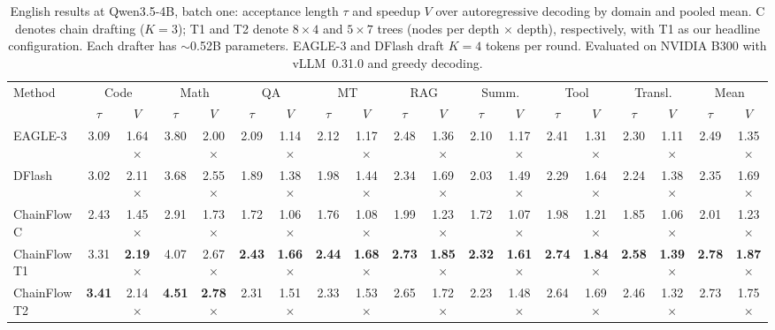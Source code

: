 \documentclass{article}
\newcommand{\Sys}{ChainFlow\xspace}
\newcommand{\TargetFamily}{Qwen3.5\xspace}          %
\newcommand{\Kserve}{3}                      %
\begin{document}
\begin{table}[!t]
\centering\small
\setlength{\tabcolsep}{2.5pt}
\caption{English results at \TargetFamily-4B, batch one: acceptance length $\tau$ and speedup $V$ over autoregressive decoding by domain and pooled mean. C denotes chain drafting ($K{=}\Kserve$); T1 and T2 denote $8\times4$ and $5\times7$ trees (nodes per depth $\times$ depth), respectively, with T1 as our headline configuration. Each drafter has $\sim$0.52B parameters. EAGLE-3 and DFlash draft $K{=}4$ tokens per round. Evaluated on NVIDIA B300 with vLLM~0.31.0 and greedy decoding.}
\label{tab:main}
\vskip 0.1in
\begin{tabular}{l *{8}{cc} | cc}
\toprule
Method & \multicolumn{2}{c}{Code} & \multicolumn{2}{c}{Math} & \multicolumn{2}{c}{QA} & \multicolumn{2}{c}{MT} & \multicolumn{2}{c}{RAG} & \multicolumn{2}{c}{Summ.} & \multicolumn{2}{c}{Tool} & \multicolumn{2}{c}{Transl.} & \multicolumn{2}{c}{Mean} \\
\cmidrule(lr){2-3} \cmidrule(lr){4-5} \cmidrule(lr){6-7} \cmidrule(lr){8-9} \cmidrule(lr){10-11} \cmidrule(lr){12-13} \cmidrule(lr){14-15} \cmidrule(lr){16-17} \cmidrule(lr){18-19}
& $\tau$ & $V$ & $\tau$ & $V$ & $\tau$ & $V$ & $\tau$ & $V$ & $\tau$ & $V$ & $\tau$ & $V$ & $\tau$ & $V$ & $\tau$ & $V$ & $\tau$ & $V$ \\
\midrule
EAGLE-3 & 3.09 & 1.64$\times$ & 3.80 & 2.00$\times$ & 2.09 & 1.14$\times$ & 2.12 & 1.17$\times$ & 2.48 & 1.36$\times$ & 2.10 & 1.17$\times$ & 2.41 & 1.31$\times$ & 2.30 & 1.11$\times$ & 2.49 & 1.35$\times$ \\
DFlash  & 3.02 & 2.11$\times$ & 3.68 & 2.55$\times$ & 1.89 & 1.38$\times$ & 1.98 & 1.44$\times$ & 2.34 & 1.69$\times$ & 2.03 & 1.49$\times$ & 2.29 & 1.64$\times$ & 2.24 & 1.38$\times$ & 2.35 & 1.69$\times$ \\
\midrule
\Sys{} C  & 2.43 & 1.45$\times$ & 2.91 & 1.73$\times$ & 1.72 & 1.06$\times$ & 1.76 & 1.08$\times$ & 1.99 & 1.23$\times$ & 1.72 & 1.07$\times$ & 1.98 & 1.21$\times$ & 1.85 & 1.06$\times$ & 2.01 & 1.23$\times$ \\
\Sys{} T1 & 3.31 & \textbf{2.19$\times$} & 4.07 & 2.67$\times$ & \textbf{2.43} & \textbf{1.66$\times$} & \textbf{2.44} & \textbf{1.68$\times$} & \textbf{2.73} & \textbf{1.85$\times$} & \textbf{2.32} & \textbf{1.61$\times$} & \textbf{2.74} & \textbf{1.84$\times$} & \textbf{2.58} & \textbf{1.39$\times$} & \textbf{2.78} & \textbf{1.87$\times$} \\
\Sys{} T2 & \textbf{3.41} & 2.14$\times$ & \textbf{4.51} & \textbf{2.78$\times$} & 2.31 & 1.51$\times$ & 2.33 & 1.53$\times$ & 2.65 & 1.72$\times$ & 2.23 & 1.48$\times$ & 2.64 & 1.69$\times$ & 2.46 & 1.32$\times$ & 2.73 & 1.75$\times$ \\
\bottomrule
\end{tabular}
\end{table}
\end{document}

